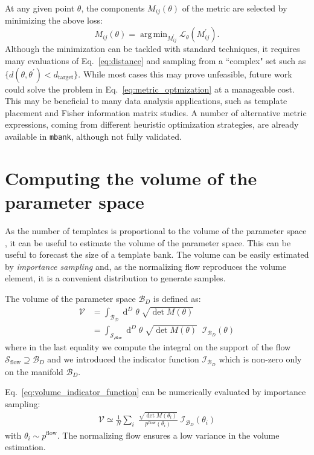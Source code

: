 \documentclass[twocolumn,showpacs,preprintnumbers,nofootinbib,prd,
superscriptaddress,10pt]{revtex4-2}
\newcommand{\dvol}[2]{\ensuremath{\operatorname{d}^{#2}\!{#1}}}
\DeclareMathOperator*{\argmin}{arg\,min}
\begin{document}
At any given point $\theta$, the components $M_{ij}(\theta)$ of the metric are selected by minimizing the above loss:
\begin{equation} \label{eq:metric_optmization}
	M_{ij}(\theta) = \argmin_{M^\prime_{ij}}  \mathcal{L}_\theta(M^\prime_{ij}).
\end{equation}
Although the minimization can be tackled with standard techniques, it requires many evaluations of Eq.~\eqref{eq:distance} and sampling from a ``complex" set such as ${\{d(\theta,\theta^\prime) < d_\mathrm{target}\}}$.
While most cases this may prove unfeasible, future work could solve the problem in Eq.~\eqref{eq:metric_optmization} at a manageable cost. This may be beneficial to many data analysis applications, such as template placement and Fisher information matrix studies.
A number of alternative metric expressions, coming from different heuristic optimization strategies, are already available in \texttt{mbank}, although not fully validated.

\section{Computing the volume of the parameter space}\label{app:parameter_space_volume}

As the number of templates is proportional to the volume of the parameter space \cite{owen_metric}, it can be useful to estimate the volume of the parameter space. This can be useful to forecast the size of a template bank.
The volume can be easily estimated by {\it importance sampling} and, as the normalizing flow reproduces the volume element, it is a convenient distribution to generate samples.

The volume of the parameter space $\mathcal{B}_D$ is defined as:
\begin{align}
	\mathcal{V} & = \int_\mathcal{\mathcal{B}_D} \dvol{\theta}{D} \; \sqrt{\det M(\theta)} \\
				& = \int_\mathcal{\mathcal{S}_\text{flow}} \dvol{\theta}{D} \; \sqrt{\det M(\theta)} \;\; \mathcal{I}_{\mathcal{B}_D}(\theta) \label{eq:volume_indicator_function}
\end{align}
where in the last equality we compute the integral on the support of the flow $\mathcal{S}_\text{flow} \supseteq \mathcal{B}_D$ and we introduced the indicator function $\mathcal{I}_{\mathcal{B}_D}$ which is non-zero only on the manifold $\mathcal{B}_D$.

Eq.~\eqref{eq:volume_indicator_function} can be numerically evaluated by importance sampling:
%
\begin{align}\label{eq:vol_IS}
	\mathcal{V} \simeq \frac{1}{N} \sum_i \; \frac{\sqrt{\det M(\theta_i)}}{p^\text{flow}(\theta_i)} \; \mathcal{I}_{\mathcal{B}_D}(\theta_i)
\end{align}
with  $\theta_i \sim p^\text{flow}$.
The normalizing flow ensures a low variance in the volume estimation.
\end{document}
